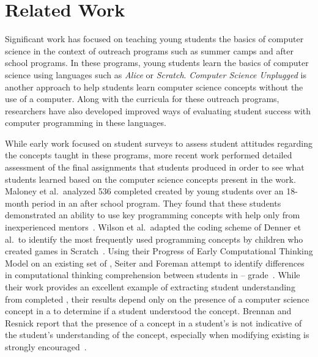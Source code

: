 \section{Related Work}
Significant work has focused on teaching young students the basics of computer
science in the context of outreach programs such as summer camps and after
school programs. In these programs, young students learn the basics of computer
science using languages such as \emph{Alice} or \emph{Scratch}. \emph{Computer
  Science Unplugged} is another approach to help students learn computer
science concepts without the use of a computer. Along with the curricula for
these outreach programs, researchers have also developed improved ways of
evaluating student success with computer programming in these languages.


While early work focused on student surveys to assess student attitudes
regarding the concepts taught in these programs, more recent work performed
detailed assessment of the final assignments that students produced in order to
see what students learned based on the computer science concepts present in the
work. Maloney et al.\ analyzed 536 completed  created by young
students over an 18-month period in an after school program. They found that
these students demonstrated an ability to use key programming concepts with
help only from inexperienced
mentors~\cite{Maloney:2008:PCU:1352135.1352260}. Wilson et al.\ adapted the
coding scheme of Denner et al.\ to identify the most frequently used
programming concepts by children who created games in
Scratch~\cite{Denner:2012:CGC:2072695.2073050, wilson12}. Using their Progress
of Early Computational Thinking Model on an existing set of ,
Seiter and Foreman attempt to identify differences in computational thinking
comprehension between students in --
grade~\cite{Seiter:2013:MLP:2493394.2493403}. While their work provides an
excellent example of extracting student understanding from completed
, their results depend only on the presence of a computer science
concept in a \sprogram{} to determine if a student understood the
concept. Brennan and Resnick report that the presence of a concept in a
student's \sprogram{} is not indicative of the student's understanding of the
concept, especially when modifying existing  is strongly
encouraged~\cite{brennan12}.

